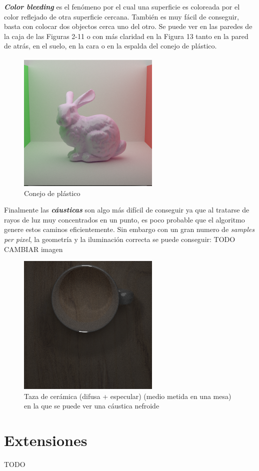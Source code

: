 \documentclass{article}
\begin{document}
\textbf{\textit{Color bleeding}} es el fenómeno por el cual una superficie es
coloreada por el color reflejado de otra superficie cercana. También es muy
fácil de conseguir, basta con colocar dos objectos cerca uno del otro. Se puede
ver en las paredes de la caja de las Figuras 2-11 o con más claridad en la
Figura 13 tanto en la pared de atrás, en el suelo, en la cara o en la espalda
del conejo de plástico. \\

\begin{figure}[H]
\centering
\includegraphics[width=0.6\linewidth]{imgs/plastic_bunny.png}
\caption{Conejo de plástico}
\end{figure}

Finalmente las \textbf{\textit{cáusticas}} son algo más difícil de conseguir ya
que al tratarse de rayos de luz muy concentrados en un punto, es poco probable
que el algoritmo genere estos caminos eficientemente. Sin embargo con un gran
numero de \textit{samples per pixel}, la geometría y la iluminación correcta se
puede conseguir: TODO CAMBIAR imagen
\begin{figure}[H]
\centering
\includegraphics[width=0.6\linewidth]{imgs/nephroid.png}
\caption{Taza de cerámica (difusa + especular) (medio metida en una mesa) en la
  que se puede ver una cáustica nefroide}
\end{figure}

\section{Extensiones}
TODO
\end{document}
